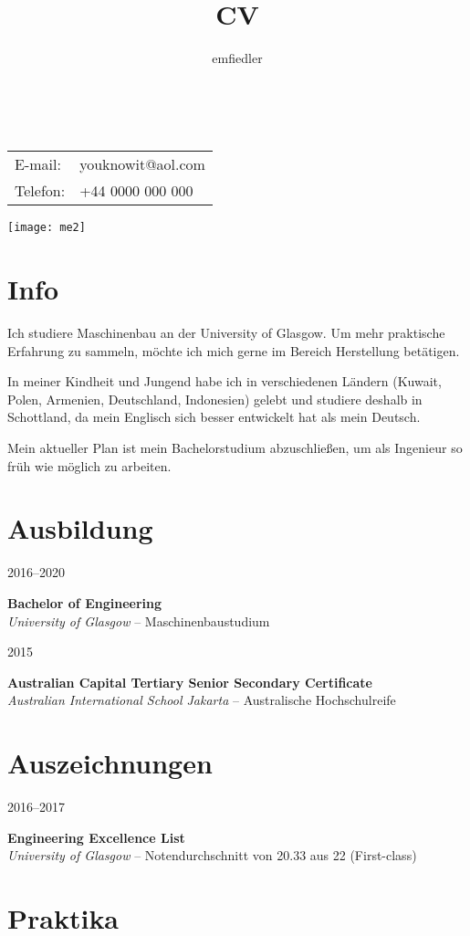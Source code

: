 \documentclass[a4paper]{article}
\title{CV}
\author{emfiedler}
\makeatletter
\renewcommand{\maketitle}{
\begin{flushleft}
{\Huge
\theauthor} \\
\vspace{2mm}
\begin{tabular}{@{} l l}
	E-mail: &youknowit@aol.com\\
	Telefon: &+44 0000 000 000
\end{tabular}

\end{flushleft}
}
\newcommand{\entry}[4]{

	\begin{minipage}[t]{.20\textwidth}
		\hfill \textsc{#1}

	\end{minipage}
	\hfill\vline\hfill
	\begin{minipage}[t]{.75\textwidth}
		\textbf{#2} \\ 
		\textit{#3}    
		#4

	\end{minipage} 
	\vspace{.25cm}

}
\makeatother
\begin{document}

\begin{minipage}{0.73\textwidth}
\maketitle
\end{minipage}
\begin{minipage}{0.25\textwidth}
	\hspace{2mm} 
	\texttt{[image: me2]}
\end{minipage}

\section{Info}
Ich studiere Maschinenbau an der University of Glasgow. Um mehr praktische Erfahrung zu sammeln, m{\"o}chte ich mich gerne im Bereich Herstellung bet{\"a}tigen.

\vspace{.25cm}

In meiner Kindheit und Jungend habe ich in verschiedenen L{\"a}ndern (Kuwait, Polen, Armenien, Deutschland, Indonesien) gelebt und studiere deshalb in Schottland, da mein Englisch sich besser entwickelt hat als mein Deutsch.

\vspace{.25cm}

Mein aktueller Plan ist mein Bachelorstudium abzuschlie{\ss}en, um als Ingenieur so fr{\"u}h wie m{\"o}glich zu arbeiten.


\section{Ausbildung}

\entry{2016--2020}{Bachelor of Engineering}{University of Glasgow}{-- Maschinenbaustudium}

\entry{2015}{Australian Capital Tertiary Senior Secondary Certificate}{Australian International School Jakarta}{-- Australische Hochschulreife}


\section{Auszeichnungen}

\entry{2016--2017}{Engineering Excellence List}{University of Glasgow}{-- Notendurchschnitt von 20.33 aus 22 (First-class)}

\section{Praktika}
\end{document}

